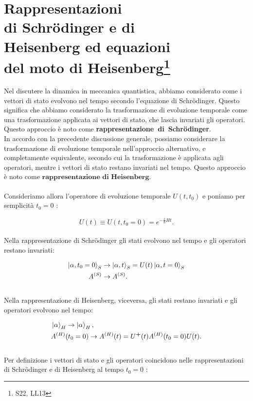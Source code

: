 \chapter[Rappresentazioni di Schrödinger e di Heisenberg]{Rappresentazioni\\ di Schrödinger e di\\ Heisenberg ed equazioni\\ del moto di Heisenberg\footnote{S22, LL13}}

Nel discutere la dinamica in meccanica quantistica, abbiamo considerato come i vettori di stato evolvono nel tempo secondo l'equazione di Schrödinger. Questo significa che abbiamo considerato la trasformazione di evoluzione temporale come una trasformazione applicata ai vettori di stato, che lascia invariati gli operatori. Questo approccio è noto come \textbf{rappresentazione~di~Schr\"{o}dinger}.\\
In accordo con la precedente discussione generale, possiamo considerare la trasformazione di evoluzione temporale nell'approccio alternativo, e completamente equivalente, secondo cui la trasformazione è applicata agli operatori, mentre i vettori di stato restano invariati nel tempo. Questo approccio è noto come $\textbf{rappresentazione~di~Heisenberg}$.\\
\\
\noindent Consideriamo allora l'operatore di evoluzione temporale $U(t, t_0)$ e poniamo per semplicità $t_0 = 0$ :
 
\begin{equation}
U(t) \equiv U(t,t_0 = 0) = e^{-\frac{i}{\hbar}Ht}.
\end{equation}
\\
\noindent Nella rappresentazione di Schrödinger gli stati evolvono nel tempo e gli operatori restano invariati:

\begin{align}
\ket{\alpha, t_0 = 0}_S &\rightarrow \ket{\alpha, t}_S = U(t) \ket{\alpha, t=0}_S \nonumber \\
A^{(S)} &\rightarrow A^{(S)}.
\end{align}
\\
\noindent Nella rappresentazione di Heisenberg, viceversa, gli stati restano invariati e gli operatori evolvono nel tempo:

\begin{align}
&\ket{\alpha}_H \rightarrow \ket{\alpha}_H, \\ \nonumber
&A^{(H)}(t_0 = 0) \rightarrow A^{(H)}(t) = U^\textbf{+}(t)A^{(H)}(t_0 = 0)U(t).
\end{align}
\\
\noindent Per definizione i vettori di stato e gli operatori coincidono nelle rappresentazioni di Schrödinger e di Heisenberg al tempo $t_0 = 0$ :


